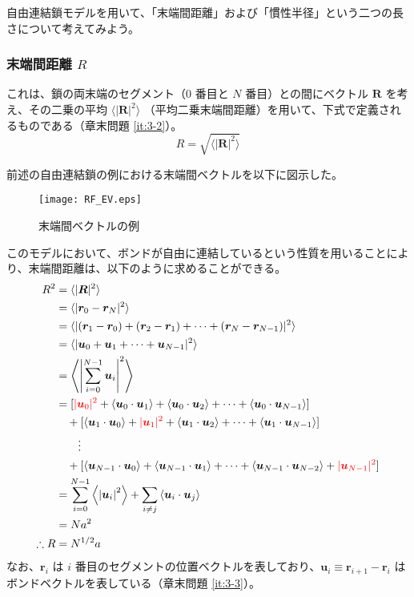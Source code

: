 \documentclass[a4paper,11pt]{ltjsarticle}
\begin{document}
自由連結鎖モデルを用いて、「末端間距離」および「慣性半径」という二つの長さについて考えてみよう。

\subsubsection{末端間距離 $R$}

これは、鎖の両末端のセグメント（0 番目と $N$ 番目）との間にベクトル $\bm{R}$ を考え、その二乗の平均 $\langle |\bm{R}|^2 \rangle$ （平均二乗末端間距離）を用いて、下式で定義されるものである（章末問題 \ref{it:3-2}）。
\begin{equation}
R=\sqrt{\langle |\bm{R}|^2 \rangle}
\end{equation}

前述の自由連結鎖の例における末端間ベクトルを以下に図示した。
\begin{figure}[htb]
	\begin{center}
		\texttt{[image: RF\_EV.eps]}
		\caption{末端間ベクトルの例}
		\label{fig: RF_EV}
	\end{center}
\end{figure}

このモデルにおいて、ボンドが自由に連結しているという性質を用いることにより、末端間距離は、以下のように求めることができる。
\begin{align}
R^2
	&= \langle |\bm{R}|^2 \rangle \notag \\
	&=\langle |\bm{r}_0 - \bm{r}_N|^2 \rangle \notag \\
	&=\langle |(\bm{r}_1 - \bm{r}_0) + (\bm{r}_2 - \bm{r}_1) + \cdots + (\bm{r}_N - \bm{r}_{N-1})|^2 \rangle \notag \\
	&=\langle |\bm{u}_0 + \bm{u}_1 + \cdots + \bm{u}_{N-1}|^2 \rangle \notag \\
	&=\left\langle \left|\sum_{i=0}^{N-1}\bm{u}_i \right|^2 \right\rangle \notag \\
	&= 
		[ 
		{\color{red} |\bm{u}_0|^2} + \langle \bm{u}_0 \cdot \bm{u}_1 \rangle + \langle \bm{u}_0 \cdot \bm{u}_2 \rangle + \cdots + \langle \bm{u}_0 \cdot \bm{u}_{N-1} \rangle 
		] \notag \\
	&\quad+ 
		[ 
		\langle \bm{u}_1 \cdot \bm{u}_0 \rangle + {\color{red} |\bm{u}_1|^2} + \langle \bm{u}_1 \cdot \bm{u}_2 \rangle + \cdots + \langle \bm{u}_1 \cdot \bm{u}_{N-1} \rangle 
		] \notag \\
	&\quad\quad \vdots \notag \\
	&\quad+ 
		[ 
		\langle \bm{u}_{N-1} \cdot \bm{u}_0 \rangle + \langle \bm{u}_{N-1} \cdot \bm{u}_1 \rangle + \cdots + \langle \bm{u}_{N-1} \cdot \bm{u}_{N-2} \rangle + {\color{red} |\bm{u}_{N-1}|^2} 
		] \notag \\
	&=\sum_{i=0}^{N-1} \left\langle \left|\bm{u}_i \right|^2 \right\rangle 
	+\sum_{i \neq j} \left\langle \bm{u}_i \cdot \bm{u}_j \right\rangle \notag \\
	&= N a^2 \notag \\
\therefore R &= N^{1/2}a
\label{eq:r2}
\end{align}
なお、$\bm{r}_i$ は $i$ 番目のセグメントの位置ベクトルを表しており、$\bm{u}_i \equiv \bm{r}_{i+1} - \bm{r}_i$ はボンドベクトルを表している（章末問題 \ref{it:3-3}）。
\end{document}
